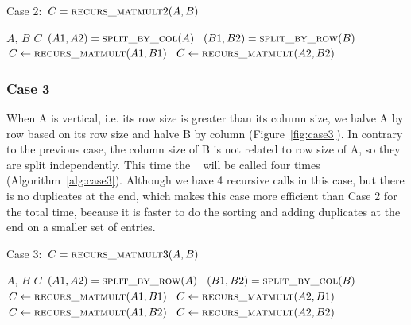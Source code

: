 \begin{algorithm}[tbh] 
  \caption{Case 2: $C = \textsc{recurs\_matmult}2(A, B)$} 
  \begin{algorithmic}[1]
    \Require $A$, $B$
    \Ensure  $C$
    \State $(A1, A2) = \textsc{split\_by\_col}(A)$
    \State $(B1, B2) = \textsc{split\_by\_row}(B)$
    \State $C \leftarrow \textsc{recurs\_matmult}(A1,B1)$
    \State $C \leftarrow \textsc{recurs\_matmult}(A2,B2)$
  \end{algorithmic}
  \label{alg:case2}
  \Description{}
\end{algorithm}

\subsubsection{Case 3}
\label{sec:case3}
When A is vertical, i.e. its row size is greater than its column size, we halve A by row based on its row size and halve B by column (Figure~\ref{fig:case3}). In contrary to the previous case, the column size of B is not related to row size of A, so they are split independently. This time the \recmm~ will be called four times (Algorithm~\ref{alg:case3}).  Although we have 4 recursive calls in this case, but there is no duplicates at the end, which makes this case more efficient than Case 2 for the total time, because it is faster to do the sorting and adding duplicates at the end on a smaller set of entries. 

\begin{algorithm}[H] 
  \caption{Case 3: $C = \textsc{recurs\_matmult}3(A, B)$} \label{alg:case3} 
  \begin{algorithmic}[1]
    \Require $A$, $B$
    \Ensure  $C$
    \State $(A1, A2) = \textsc{split\_by\_row}(A)$
    \State $(B1, B2) = \textsc{split\_by\_col}(B)$
    \State $C \leftarrow \textsc{recurs\_matmult}(A1,B1)$
    \State $C \leftarrow \textsc{recurs\_matmult}(A2,B1)$
    \State $C \leftarrow \textsc{recurs\_matmult}(A1,B2)$
    \State $C \leftarrow \textsc{recurs\_matmult}(A2,B2)$
  \end{algorithmic}
  \label{alg:case3}
\end{algorithm}

